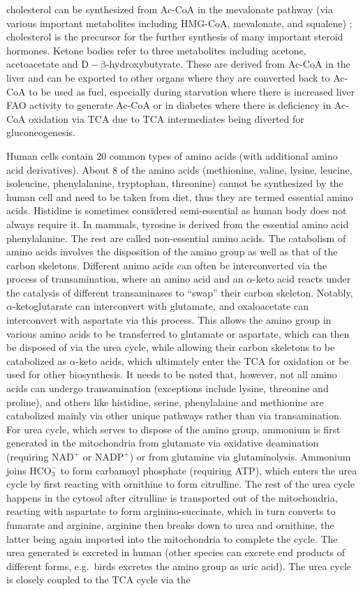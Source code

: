 \documentclass[12pt,twoside,openany,\mydriver]{thesis}  %
\begin{document}
cholesterol can be synthesized from Ac-CoA in the mevalonate pathway (via various important metabolites including HMG-CoA, mevalonate, and squalene) ; cholesterol is the precursor for the further synthesis of many important steroid hormones. Ketone bodies refer to three metabolites including acetone, acetoacetate and \(\mathrm{D-\beta}\)-hydroxybutyrate. These are derived from Ac-CoA in the liver and can be exported to other organs where they are converted back to Ac-CoA to be used as fuel, especially during starvation where there is increased liver FAO activity to generate Ac-CoA or in diabetes where there is deficiency in Ac-CoA oxidation via TCA due to TCA intermediates being diverted for gluconeogenesis.

Human cells contain 20 common types of amino acids (with additional amino acid derivatives). About 8 of the amino acids (methionine, valine, lysine, leucine, isoleucine, phenylalanine, tryptophan, threonine) cannot be synthesized by the human cell and need to be taken from diet, thus they are termed essential amino acids. Histidine is sometimes considered semi-essential as human body does not always require it. In mammals, tyrosine is derived from the essential amino acid phenylalanine. The rest are called non-essential amino acids. The catabolism of amino acids involves the disposition of the amino group as well as that of the carbon skeletons. Different animo acids can often be interconverted via the process of transamination, where an amino acid and an \(\alpha\)-keto acid reacts under the catalysis of different transaminases to ``swap'' their carbon skeleton. Notably, \(\alpha\)-ketoglutarate can interconvert with glutamate, and oxaloacetate can interconvert with aspartate via this process. This allows the amino group in various amino acids to be transferred to glutamate or aspartate, which can then be disposed of via the urea cycle, while allowing their carbon skeletons to be catabolized as \(\alpha\)-keto acids, which ultimately enter the TCA for oxidation or be used for other biosynthesis. It needs to be noted that, however, not all amino acids can undergo transamination (exceptions include lysine, threonine and proline), and others like histidine, serine, phenylalaine and methionine are catabolized mainly via other unique pathways rather than via transamination. For urea cycle, which serves to dispose of the amino group, ammonium is first generated in the mitochondria from glutamate via oxidative deamination (requiring \(\mathrm{NAD^+}\) or \(\mathrm{NADP^+}\)) or from glutamine via glutaminolysis. Ammonium joins \(\mathrm{HCO_3^-}\) to form carbamoyl phosphate (requiring ATP), which enters the urea cycle by first reacting with ornithine to form citrulline. The rest of the urea cycle happens in the cytosol after citrulline is transported out of the mitochondria, reacting with aspartate to form arginino-succinate, which in turn converts to fumarate and arginine, arginine then breaks down to urea and ornithine, the latter being again imported into the mitochondria to complete the cycle. The urea generated is excreted in human (other species can excrete end products of different forms, e.g.~birds excretes the amino group as uric acid). The urea cycle is closely coupled to the TCA cycle via the 
\end{document}
